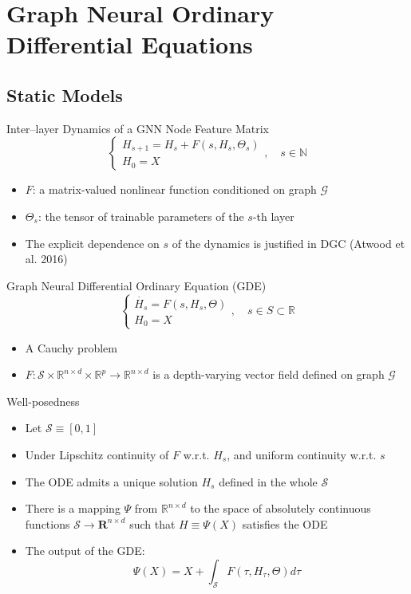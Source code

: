\documentclass{beamer}
\begin{document}
\section{Graph Neural Ordinary Differential Equations}
\subsection{Static Models}
\begin{frame}{Inter–layer Dynamics of a GNN Node Feature Matrix}
\[
\begin{cases}
H_{s+1}=H_s+F(s,H_s,\Theta_s)\\
H_0=X
\end{cases},\quad s\in\mathbb{N}
\]\begin{itemize}
\item $F$: a matrix-valued nonlinear function conditioned on graph $\mathcal G$
\item $\Theta_s$: the tensor of trainable parameters of the $s$-th layer
\item The explicit dependence on $s$ of the dynamics is justified in DGC (Atwood et al. 2016)
\end{itemize}
\end{frame}

\begin{frame}{Graph Neural Differential Ordinary Equation (GDE)}
\[
\begin{cases}
\dot{H_s}=F(s,H_s,\Theta)\\
H_0=X
\end{cases},\quad s\in S\subset\mathbb{R}
\]\begin{itemize}
\item A Cauchy problem
\item $F: \mathcal{S}\times\mathbb{R}^{n\times d}\times\mathbb{R}^p\to\mathbb{R}^{n\times d}$ is a depth-varying vector field defined on graph $\mathcal{G}$
\end{itemize}
\end{frame}

\begin{frame}{Well-posedness}
\begin{itemize}
\item Let $\mathcal S\equiv[0,1]$
\item Under Lipschitz continuity of $F$ w.r.t. $H_s$, and uniform continuity w.r.t. $s$
\item The ODE admits a unique solution $H_s$ defined in the whole $\mathcal{S}$
\item There is a mapping $\Psi$ from $\mathbb{R}^{n\times d}$ to the space of absolutely continuous functions $\mathcal{S}\to\mathbf{R}^{n\times d}$ such that $H\equiv\Psi(X)$ satisfies the ODE
\item The output of the GDE:\[
\Psi(X)=X+\int_{\mathcal{S}}F(\tau,H_\tau,\Theta)d\tau
\]
\end{itemize}
\end{frame}
\end{document}
